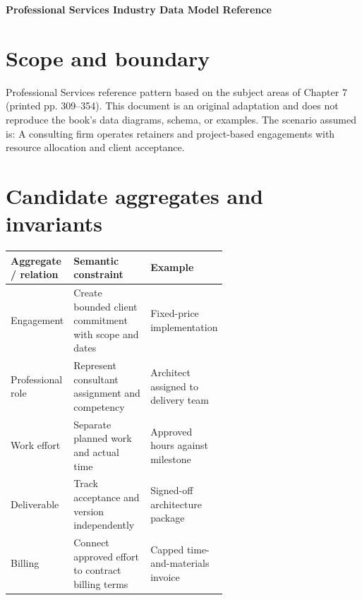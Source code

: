 \documentclass[11pt,letterpaper]{article}
\begin{document}
\begin{center}
{\LARGE\bfseries\color{navy} Professional Services Industry Data Model Reference}\par
\vspace{0.25em}{\large Conceptual to logical reference | original adaptation}\par
{}
\end{center}
\vspace{0.8em}
\section{Scope and boundary}
Professional Services reference pattern based on the subject areas of Chapter 7 (printed pp. 309--354). This document is an original adaptation and does not reproduce the book's data diagrams, schema, or examples. The scenario assumed is: A consulting firm operates retainers and project-based engagements with resource allocation and client acceptance.


\section{Candidate aggregates and invariants}
\begin{tabularx}{\linewidth}{@{}>{\raggedright\arraybackslash}p{0.23\linewidth} >{\raggedright\arraybackslash}p{0.38\linewidth}>{\raggedright\arraybackslash}X@{}}
\toprule
\textbf{Aggregate / relation} & \textbf{Semantic constraint} & \textbf{Example} \\ 
\midrule
Engagement & Create bounded client commitment with scope and dates & Fixed-price implementation \\ 
Professional role & Represent consultant assignment and competency & Architect assigned to delivery team \\ 
Work effort & Separate planned work and actual time & Approved hours against milestone \\ 
Deliverable & Track acceptance and version independently & Signed-off architecture package \\ 
Billing & Connect approved effort to contract billing terms & Capped time-and-materials invoice \\ 
\bottomrule
\end{tabularx}
\end{document}
